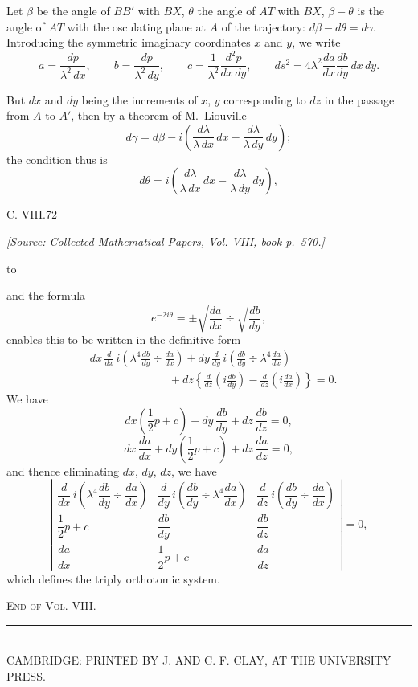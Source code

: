 \documentclass[11pt,a4paper]{article}
\theoremstyle{plain}
\theoremstyle{definition}
\newcommand{\sourcepage}[1]{%
  \par\noindent\textit{[Source: Collected Mathematical Papers, Vol. VIII, book p.~#1.]}\par\medskip
}
\begin{document}
Let $\beta$ be the angle of $BB'$ with $BX$, $\theta$ the angle of $AT$ with $BX$, $\beta-\theta$ is the
angle of $AT$ with the osculating plane at $A$ of the trajectory: $d\beta-d\theta=d\gamma$. Introducing
the symmetric imaginary coordinates $x$ and $y$, we write
\[
  a=\frac{dp}{\lambda^2\,dx},\qquad
  b=\frac{dp}{\lambda^2\,dy},\qquad
  c=\frac{1}{\lambda^2}\frac{d^2p}{dx\,dy},\qquad
  ds^2=4\lambda^2\frac{da}{dx}\frac{db}{dy}\,dx\,dy.
\]

But $dx$ and $dy$ being the increments of $x$, $y$ corresponding to $dz$ in the passage
from $A$ to $A'$, then by a theorem of M.~Liouville
\[
  d\gamma=d\beta-i\left(\frac{d\lambda}{\lambda\,dx}\,dx
  -\frac{d\lambda}{\lambda\,dy}\,dy\right);
\]
the condition thus is
\[
  d\theta=i\left(\frac{d\lambda}{\lambda\,dx}\,dx
  -\frac{d\lambda}{\lambda\,dy}\,dy\right),
\]

\vfill
\noindent C. VIII.\hfill 72

\clearpage

\sourcepage{570}
\noindent
\hbox to 

\medskip
\noindent
and the formula
\[
  e^{-2i\theta}=\pm\sqrt{\frac{da}{dx}}\div\sqrt{\frac{db}{dy}},
\]
enables this to be written in the definitive form
\[
\begin{aligned}
&dx\,\frac{d}{dx}\,i\left(\lambda^4\frac{db}{dy}\div\frac{da}{dx}\right)
 +dy\,\frac{d}{dy}\,i\left(\frac{db}{dy}\div\lambda^4\frac{da}{dx}\right)\\
&\hspace{7em}
 +dz\left\{\frac{d}{dz}\left(i\frac{db}{dy}\right)
       -\frac{d}{dz}\left(i\frac{da}{dx}\right)\right\}=0.
\end{aligned}
\]
We have
\[
  dx\left(\frac{1}{2}p+c\right)+dy\,\frac{db}{dy}+dz\,\frac{db}{dz}=0,
\]
\[
  dx\,\frac{da}{dx}+dy\left(\frac{1}{2}p+c\right)+dz\,\frac{da}{dz}=0,
\]
and thence eliminating $dx$, $dy$, $dz$, we have
\[
\left|
\begin{array}{ccc}
\dfrac{d}{dx}\,i\left(\lambda^4\dfrac{db}{dy}\div\dfrac{da}{dx}\right) &
\dfrac{d}{dy}\,i\left(\dfrac{db}{dy}\div\lambda^4\dfrac{da}{dx}\right) &
\dfrac{d}{dz}\,i\left(\dfrac{db}{dy}\div\dfrac{da}{dx}\right) \\[1.2em]
\dfrac{1}{2}p+c & \dfrac{db}{dy} & \dfrac{db}{dz} \\[1.2em]
\dfrac{da}{dx} & \dfrac{1}{2}p+c & \dfrac{da}{dz}
\end{array}
\right|=0,
\]
which defines the triply orthotomic system.

\vfill
\begin{center}
{\scshape End of Vol. VIII.}
\end{center}

\vfill
\begin{center}
\rule{0.48\linewidth}{0.3pt}\\[0.5em]
\footnotesize CAMBRIDGE: PRINTED BY J. AND C. F. CLAY, AT THE UNIVERSITY PRESS.
\end{center}
\end{document}
